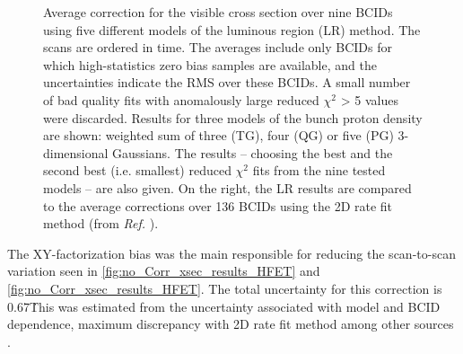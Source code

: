 \begin{figure}[!htb]
	\centering
	\caption{Average correction for the visible cross section over nine BCIDs using five different models of the luminous region (LR) method. The scans are ordered in time. The averages include only BCIDs for which high-statistics zero bias samples are available, and the uncertainties indicate the RMS over these BCIDs. A small number of bad quality fits with anomalously large reduced $\chi^2$ > 5 values were discarded. Results for three models of the bunch proton density are shown: weighted sum of three (TG), four (QG) or five (PG) 3-dimensional Gaussians. The results – choosing the best and the second best (i.e. smallest) reduced $\chi^2$ fits from the nine tested models – are also given. On the right, the LR results are compared to the average corrections over 136 BCIDs using the 2D rate fit method (from \textit{Ref.} \cite{CMS-DP-2024-068}).}
	\label{fig:luminous_region_vs_2d_rate_fit}
\end{figure}

The XY-factorization bias was the main responsible for reducing the scan-to-scan variation seen in \autoref{fig:no_Corr_xsec_results_HFET} and \autoref{fig:no_Corr_xsec_results_HFET}. The total uncertainty for this correction is 0.67\. This was estimated from the uncertainty associated with model and BCID dependence, maximum discrepancy with 2D rate fit method among other sources \cite{CMS-PAS-LUM-22-001}.

